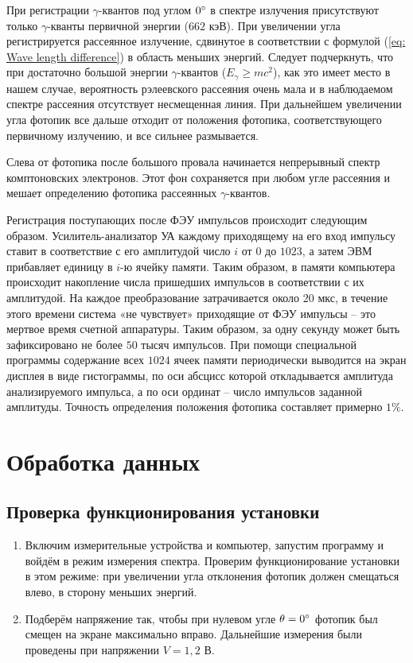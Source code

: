 \documentclass[a4paper,12pt]{article}
\begin{document}
При регистрации $\gamma$-квантов под углом $0\degree$ в спектре излучения присутствуют только $\gamma$-кванты первичной энергии ($662$ кэВ). При увеличении угла регистрируется рассеянное излучение, сдвинутое в соответствии с формулой (\ref{eq: Wave length difference}) в область меньших энергий. Следует подчеркнуть, что при достаточно большой энергии $\gamma$-квантов ($E_\gamma \geq mc^2$), как это имеет место в нашем случае, вероятность рэлеевского рассеяния очень мала и в наблюдаемом спектре рассеяния отсутствует несмещенная линия. При дальнейшем увеличении угла фотопик все дальше отходит от положения фотопика, соответствующего первичному излучению, и все сильнее размывается.

Слева от фотопика после большого провала начинается непрерывный
спектр комптоновских электронов. Этот фон сохраняется при любом
угле рассеяния и мешает определению фотопика рассеянных $\gamma$-квантов.

Регистрация поступающих после ФЭУ импульсов происходит следующим образом. Усилитель-анализатор УА каждому приходящему на его вход импульсу ставит в соответствие с его амплитудой число $i$ от $0$ до $1023$, а затем ЭВМ прибавляет единицу в $i$-ю ячейку памяти. Таким образом, в памяти компьютера происходит накопление числа пришедших
импульсов в соответствии с их амплитудой. На каждое преобразование затрачивается около $20$ мкс, в течение этого времени система «не чувствует» приходящие от ФЭУ импульсы -- это мертвое время счетной аппаратуры. Таким образом, за одну секунду может быть зафиксировано не более $50$ тысяч импульсов. При помощи специальной программы содержание всех $1024$ ячеек памяти периодически выводится на экран дисплея в виде гистограммы, по оси абсцисс которой откладывается амплитуда анализируемого импульса, а по оси ординат -- число импульсов заданной амплитуды. Точность определения положения фотопика составляет примерно $1\%$.


\section{Обработка данных}

\subsection{Проверка функционирования установки}
\begin{enumerate}
    \item
    Включим измерительные устройства и компьютер, запустим программу и войдём в режим измерения спектра. Проверим функционирование установки в этом режиме: при увеличении угла отклонения фотопик должен смещаться влево, в сторону меньших энергий.
    \item 
    Подберём напряжение так, чтобы при нулевом угле $\theta =0\degree$ фотопик был смещен на экране максимально вправо. Дальнейшие измерения были проведены при напряжении $V = 1,2$ В.
\end{enumerate}
\end{document}
